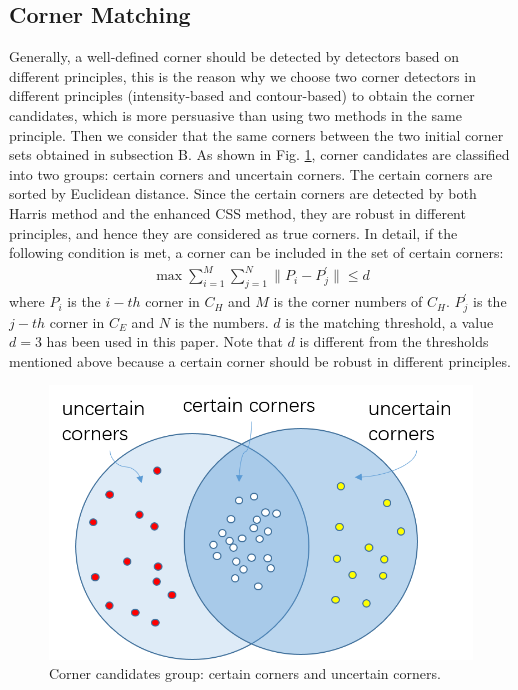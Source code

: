 \documentclass[letterpaper, 10 pt, conference]{ieeeconf}  %
\begin{document}
\subsection{Corner Matching}
Generally, a well-defined corner should be detected by detectors based on different principles, this is the reason why we choose two corner detectors in different principles (intensity-based and contour-based) to obtain the corner candidates, which is more persuasive than using two methods in the same principle. Then we consider that the same corners between the two initial corner sets obtained in subsection B. As shown in Fig. \ref{Corner candidates group}, corner candidates are classified into two groups: certain corners and uncertain corners. The certain corners are sorted by Euclidean distance. Since the certain corners are detected by both Harris method and the enhanced CSS method, they are robust in different principles, and hence they are considered as true corners. In detail, if the following condition is met, a corner can be included in the set of certain corners:
\begin{equation}
\begin{split}
\operatorname { max } \sum _ { i = 1 } ^ { M } \sum _ { j = 1 } ^ { N } \| P _ { i } - P _ { j } ^ { \prime } \| \leq d
\end{split}
\label{corner matching_Euclidean distance}
\end{equation}
where ${P _ { i }}$ is the ${i-th}$ corner in ${C_{H}}$ and ${M}$ is the corner numbers of ${C_{H}}$. ${P _ { j } ^ { \prime }}$ is the ${j-th}$ corner in ${C_{E}}$ and ${N}$ is the numbers. ${d}$ is the matching threshold, a value ${d = 3}$ has been used in this paper. Note that ${d}$ is different from the thresholds mentioned above because a certain corner should be robust in different principles. 
\begin{figure}[htbp]
\centering
\includegraphics[width=.9\linewidth]{experiments/cetain_uncertain_corners.png}
\caption{Corner candidates group: certain corners and uncertain corners.}
\label{Corner candidates group}
\end{figure}
\end{document}
